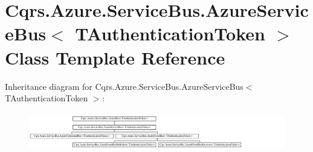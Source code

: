 \hypertarget{classCqrs_1_1Azure_1_1ServiceBus_1_1AzureServiceBus}{}\section{Cqrs.\+Azure.\+Service\+Bus.\+Azure\+Service\+Bus$<$ T\+Authentication\+Token $>$ Class Template Reference}
\label{classCqrs_1_1Azure_1_1ServiceBus_1_1AzureServiceBus}
Inheritance diagram for Cqrs.\+Azure.\+Service\+Bus.\+Azure\+Service\+Bus$<$ T\+Authentication\+Token $>$\+:\begin{figure}[H]
\begin{center}
\leavevmode
\includegraphics[height=1.689291cm]{classCqrs_1_1Azure_1_1ServiceBus_1_1AzureServiceBus}
\end{center}
\end{figure}
